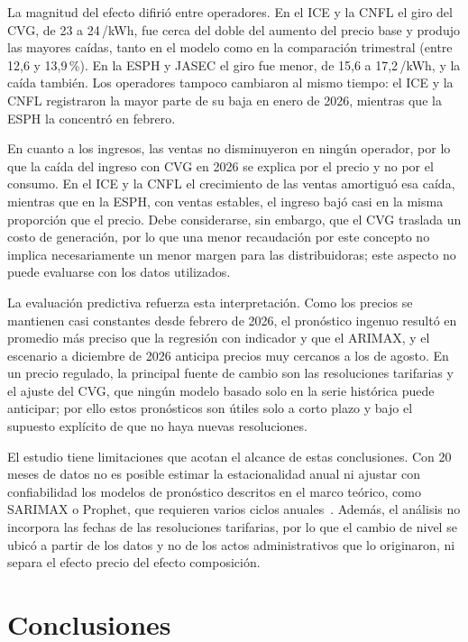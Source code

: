 \documentclass[conference]{IEEEtran}
\newcommand{\crc}{\textcolonmonetary} %
\begin{document}
La magnitud del efecto difiri\'o entre operadores. En el ICE y la CNFL el giro del CVG, de 23 a 24\,\crc/kWh, fue cerca del doble del aumento del precio base y produjo las mayores ca\'idas, tanto en el modelo como en la comparaci\'on trimestral (entre 12,6 y 13,9\,\%). En la ESPH y JASEC el giro fue menor, de 15,6 a 17,2\,\crc/kWh, y la ca\'ida tambi\'en. Los operadores tampoco cambiaron al mismo tiempo: el ICE y la CNFL registraron la mayor parte de su baja en enero de 2026, mientras que la ESPH la concentr\'o en febrero.

En cuanto a los ingresos, las ventas no disminuyeron en ning\'un operador, por lo que la ca\'ida del ingreso con CVG en 2026 se explica por el precio y no por el consumo. En el ICE y la CNFL el crecimiento de las ventas amortigu\'o esa ca\'ida, mientras que en la ESPH, con ventas estables, el ingreso baj\'o casi en la misma proporci\'on que el precio. Debe considerarse, sin embargo, que el CVG traslada un costo de generaci\'on, por lo que una menor recaudaci\'on por este concepto no implica necesariamente un menor margen para las distribuidoras; este aspecto no puede evaluarse con los datos utilizados. 

La evaluaci\'on predictiva refuerza esta interpretaci\'on. Como los precios se mantienen casi constantes desde febrero de 2026, el pron\'ostico ingenuo result\'o en promedio m\'as preciso que la regresi\'on con indicador y que el ARIMAX, y el escenario a diciembre de 2026 anticipa precios muy cercanos a los de agosto. En un precio regulado, la principal fuente de cambio son las resoluciones tarifarias y el ajuste del CVG, que ning\'un modelo basado solo en la serie hist\'orica puede anticipar; por ello estos pron\'osticos son \'utiles solo a corto plazo y bajo el supuesto expl\'icito de que no haya nuevas resoluciones.

El estudio tiene limitaciones que acotan el alcance de estas conclusiones. Con 20 meses de datos no es posible estimar la estacionalidad anual ni ajustar con confiabilidad los modelos de pron\'ostico descritos en el marco te\'orico, como SARIMAX o Prophet, que requieren varios ciclos anuales~\cite{r13}. Adem\'as, el an\'alisis no incorpora las fechas de las resoluciones tarifarias, por lo que el cambio de nivel se ubic\'o a partir de los datos y no de los actos administrativos que lo originaron, ni separa el efecto precio del efecto composici\'on.

\section{Conclusiones}
\label{sec:conclusiones}
\end{document}
